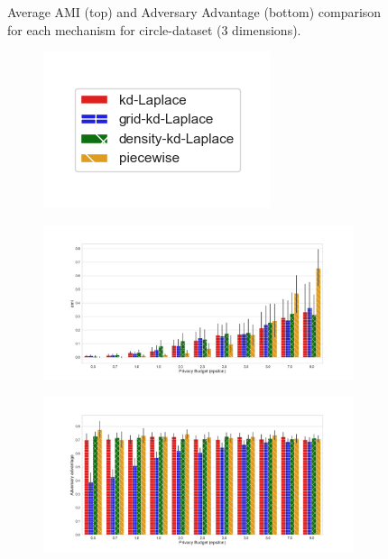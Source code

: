 \begin{figure}[H]
\begin{subfigure}{1\textwidth}
      \end{subfigure}
      \caption{Average AMI (top) and Adversary Advantage (bottom) comparison for each mechanism for circle-dataset (3 dimensions).}
      \label{fig:utility_circle-dataset_comparison_nd_plot}
\end{figure}
\newpage

\begin{figure}[H]
      \centering
      \begin{subfigure}{0.30\textwidth}
            \includegraphics[width=\textwidth]{Results/kd-laplace/ami_bar_comparison_legend.png}
      \end{subfigure}
      \begin{subfigure}{1\textwidth}
            \includegraphics[width=1\textwidth]{Results/kd-laplace/ami_skewed-dataset_comparison.png}
      \end{subfigure}
      \begin{subfigure}{1\textwidth}
            \includegraphics[width=1\textwidth]{Results/kd-laplace/shokri_mi_adv_skewed-dataset_comparison.png}

\end{subfigure}
\end{figure}
